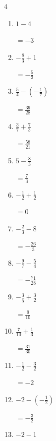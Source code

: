 \begin{multicols}{4}
\begin{enumerate}
\columnbreak %

  \item $\displaystyle 1 - 4$

        $\displaystyle =-3$

  \item $\displaystyle -\frac{8}{3} + 1$

        $\displaystyle =-\frac{5}{3}$

  \item $\displaystyle \frac{5}{4} - \left(-\frac{1}{7}\right)$

        $\displaystyle =\frac{39}{28}$

  \item $\displaystyle \frac{3}{7} + \frac{7}{3}$

        $\displaystyle =\frac{58}{21}$

  \item $\displaystyle 5 - \frac{8}{3}$

        $\displaystyle =\frac{7}{3}$

  \item $\displaystyle -\frac{1}{2} + \frac{1}{2}$

        $\displaystyle =0$

  \item $\displaystyle -\frac{2}{3} - 8$

        $\displaystyle =-\frac{26}{3}$

  \item $\displaystyle -\frac{9}{7} - \frac{5}{4}$

        $\displaystyle =-\frac{71}{28}$

  \item $\displaystyle -\frac{3}{5} + \frac{3}{2}$

        $\displaystyle =\frac{9}{10}$

  \item $\displaystyle \frac{7}{10} + \frac{1}{3}$

        $\displaystyle =\frac{31}{30}$

\columnbreak %

  \item $\displaystyle -\frac{1}{2} - \frac{3}{2}$

        $\displaystyle =-2$

  \item $\displaystyle -2 - \left(-\frac{1}{2}\right)$

        $\displaystyle =-\frac{3}{2}$

  \item $\displaystyle -2 - 1$


\end{enumerate}
\end{multicols}
